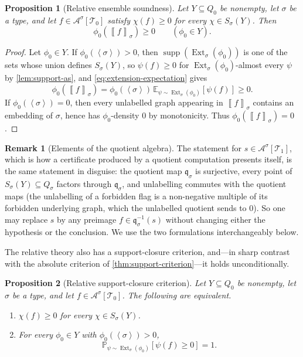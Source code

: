\documentclass[11pt]{article}
\newtheorem{proposition}[proposition]{Proposition}
\theoremstyle{definition}
\newtheorem{remark}[remark]{Remark}
\newcommand{\E}{\mathbb{E}}
\newcommand{\Prob}{\mathbb{P}}
\newcommand{\A}{\mathcal{A}}
\newcommand{\T}{\mathcal{T}}
\newcommand{\Ext}{\operatorname{Ext}}
\newcommand{\supp}{\operatorname{supp}}
\newcommand{\brak}[1]{\left\langle #1\right\rangle}
\newcommand{\avg}[2]{\left\llbracket #1 \right\rrbracket_{#2}}
\newcommand{\qmap}{\mathfrak q}
\begin{document}
\begin{proposition}[Relative ensemble soundness]\label{prop:relative-soundness}
Let $Y\subseteq Q_0$ be nonempty, let $\sigma$ be a type, and let
$f\in\A^\sigma[\T_0]$ satisfy $\chi(f)\ge0$ for every $\chi\in S_\sigma(Y)$.  Then
\[
  \phi_0(\avg{f}{\sigma})\ge0
  \qquad(\phi_0\in Y).
\]
\end{proposition}

\begin{proof}
Let $\phi_0\in Y$.  If $\phi_0(\brak\sigma)>0$, then $\supp(\Ext_\sigma(\phi_0))$ is one
of the sets whose union defines $S_\sigma(Y)$, so $\psi(f)\ge0$ for
$\Ext_\sigma(\phi_0)$-almost every $\psi$ by \cref{lem:support-as}, and
\eqref{eq:extension-expectation} gives
\[
  \phi_0(\avg{f}{\sigma})
  =
  \phi_0(\brak\sigma)\,
  \E_{\psi\sim\Ext_\sigma(\phi_0)}[\psi(f)]
  \ge0.
\]
If $\phi_0(\brak\sigma)=0$, then every unlabelled graph appearing in
$\avg{f}{\sigma}$ contains an embedding of $\sigma$, hence has $\phi_0$-density $0$ by
monotonicity.  Thus $\phi_0(\avg{f}{\sigma})=0$.
\end{proof}

\begin{remark}[Elements of the quotient algebra]\label{rem:quotient-elements}
The statement for $s\in\A^\sigma[\T_1]$, which is how a certificate produced by a
quotient computation presents itself, is the same statement in disguise: the quotient map
$\qmap_\sigma$ is surjective, every point of $S_\sigma(Y)\subseteq Q_\sigma$ factors
through $\qmap_\sigma$, and unlabelling commutes with the quotient maps (the unlabelling
of a forbidden flag is a non-negative multiple of its forbidden underlying graph, which
the unlabelled quotient sends to $0$).  So one may replace $s$ by any preimage
$f\in\qmap_\sigma^{-1}(s)$ without changing either the hypothesis or the conclusion.  We
use the two formulations interchangeably below.
\end{remark}

The relative theory also has a support-closure criterion, and---in sharp contrast with
the absolute criterion of \cref{thm:support-criterion}---it holds unconditionally.

\begin{proposition}[Relative support-closure criterion]\label{prop:relative-criterion}
Let $Y\subseteq Q_0$ be nonempty, let $\sigma$ be a type, and let $f\in\A^\sigma[\T_0]$.
The following are equivalent.
\begin{enumerate}[label=\textup{(\alph*)}, leftmargin=2.8em]
  \item\label{rel-crit-support} $\chi(f)\ge0$ for every $\chi\in S_\sigma(Y)$.
  \item\label{rel-crit-ensemble} For every $\phi_0\in Y$ with $\phi_0(\brak\sigma)>0$,
  \[
    \Prob_{\psi\sim\Ext_\sigma(\phi_0)}[\psi(f)\ge0]=1.
  \]
\end{enumerate}
\end{proposition}
\end{document}
